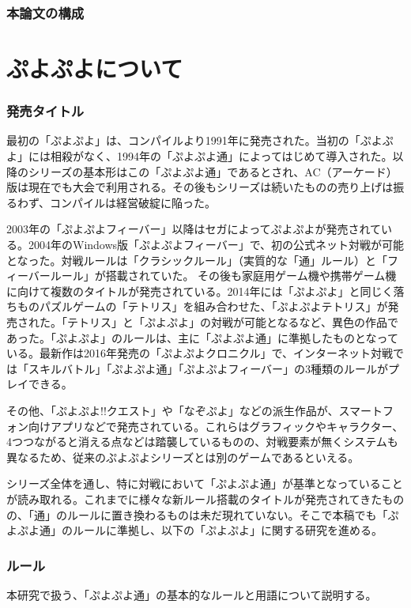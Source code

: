 \documentclass[12pt]{jarticle}
\begin{document}
\section{本論文の構成}


\part{ぷよぷよについて} \setcounter{section}{0}
\section{発売タイトル}
最初の「ぷよぷよ」は、コンパイルより1991年に発売された。当初の「ぷよぷよ」には相殺がなく、1994年の「ぷよぷよ通」によってはじめて導入された。以降のシリーズの基本形はこの「ぷよぷよ通」であるとされ、AC（アーケード）版は現在でも大会で利用される。その後もシリーズは続いたものの売り上げは振るわず、コンパイルは経営破綻に陥った。

2003年の「ぷよぷよフィーバー」以降はセガによってぷよぷよが発売されている。2004年のWindows版「ぷよぷよフィーバー」で、初の公式ネット対戦が可能となった。対戦ルールは「クラシックルール」（実質的な「通」ルール）と「フィーバールール」が搭載されていた。
その後も家庭用ゲーム機や携帯ゲーム機に向けて複数のタイトルが発売されている。2014年には「ぷよぷよ」と同じく落ちものパズルゲームの「テトリス」を組み合わせた、「ぷよぷよテトリス」が発売された。「テトリス」と「ぷよぷよ」の対戦が可能となるなど、異色の作品であった。「ぷよぷよ」のルールは、主に「ぷよぷよ通」に準拠したものとなっている。最新作は2016年発売の「ぷよぷよクロニクル」で、インターネット対戦では「スキルバトル」「ぷよぷよ通」「ぷよぷよフィーバー」の3種類のルールがプレイできる。

その他、「ぷよぷよ!!クエスト」や「なぞぷよ」などの派生作品が、スマートフォン向けアプリなどで発売されている。これらはグラフィックやキャラクター、4つつながると消える点などは踏襲しているものの、対戦要素が無くシステムも異なるため、従来のぷよぷよシリーズとは別のゲームであるといえる。

シリーズ全体を通し、特に対戦において「ぷよぷよ通」が基準となっていることが読み取れる。これまでに様々な新ルール搭載のタイトルが発売されてきたものの、「通」のルールに置き換わるものは未だ現れていない。そこで本稿でも「ぷよぷよ通」のルールに準拠し、以下の「ぷよぷよ」に関する研究を進める。

\section{ルール} \label{rule}
本研究で扱う、「ぷよぷよ通」の基本的なルールと用語について説明する。
\end{document}
